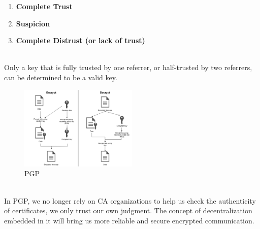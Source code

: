 \begin{enumerate}[]
    \item \textbf{Complete Trust}
    \item \textbf{Suspicion}
    \item \textbf{Complete Distrust (or lack of trust)}
    \end{enumerate}
\\
Only a key that is fully trusted by one referrer, or half-trusted by two referrers, 
can be determined to be a valid key.

\begin{figure}[H] %
    \centering %
    \includegraphics[width=0.5\textwidth]{figures/PGP.png} %
    \caption{PGP} %
    \label{Fig.6: PGP} %
    \end{figure}
\\
In PGP, we no longer rely on CA organizations to help us check the authenticity of 
certificates, we only trust our own judgment. The concept of decentralization embedded 
in it will bring us more reliable and secure encrypted communication\cite{b36}.